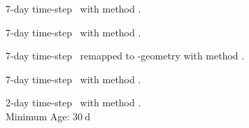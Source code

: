 \begin{fullwidth}
\begin{multicols}{2}
\begin{definition}\label{def:aviI}
7-day time-step \AVI~with method \MI.
\end{definition}
\begin{definition}\label{def:aviII}
7-day time-step \AVI~with method \MII.
\end{definition}
\begin{definition}\label{def:p2aII}
7-day time-step \POP~remapped to \AVI-geometry with method \MII.
\end{definition}
\begin{definition}\label{def:pop7II}
7-day time-step \POP~with method \MII.
\end{definition}
\begin{definition}\label{def:pop2II}
2-day time-step \POP~with method \MII. \\Minimum Age: $\SI{30}{\day}$ 
\end{definition}


\end{multicols}
\end{fullwidth}
